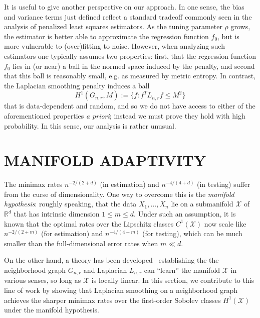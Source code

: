 \documentclass[twoside]{article}
\newcommand{\Reals}{\mathbb{R}}
\newcommand{\1}{\mathbf{1}}
\newcommand{\Rd}{\Reals^d}
\newcommand{\Lap}{L}
\newcommand{\Xset}{\mathcal{X}}
\theoremstyle{definition}
\theoremstyle{remark}
\begin{document}
It is useful to give another perspective on our approach. In one sense, the bias and variance terms just defined reflect a standard tradeoff commonly seen in the analysis of penalized least squares estimators. As the tuning parameter $\rho$ grows, the estimator is better able to approximate the regression function $f_0$, but is more vulnerable to (over)fitting to noise. However, when analyzing such estimators one typically assumes two properties: first, that the regression function $f_0$ lies in (or near) a ball in the normed space induced by the penalty, and second that this ball is reasonably small, e.g. as measured by metric entropy. In contrast, the Laplacian smoothing penalty induces a ball
\begin{equation*}
H^1(G_{n,r},M) := \{f: f^T \Lap_{n,r} f \leq M^2\}
\end{equation*}
that is data-dependent and random, and so we do not have access to either of the aforementioned properties \emph{a priori}; instead we must prove they hold with high probability. In this sense, our analysis is rather unusual.

\section{MANIFOLD ADAPTIVITY}
\label{sec:manifold_adaptivity}
The minimax rates $n^{-2/(2 + d)}$ (in estimation) and $n^{-4/(4 + d)}$ (in testing) suffer from the curse of dimensionality. One way to overcome this is the \emph{manifold hypothesis}: roughly speaking, that the data $X_1,\ldots,X_n$ lie on a submanifold $\Xset$ of $\Rd$ that has intrinsic dimension $1 \leq m \leq d$. Under such an assumption, it is known \citep{bickel2007, ariascastro2018} that the optimal rates over the Lipschitz classes $C^1(\Xset)$ now scale like $n^{-2/(2 + m)}$ (for estimation) and $n^{-4/(4 + m)}$ (for testing), which can be much smaller than the full-dimensional error rates when $m \ll d$. 

On the other hand, a theory has been developed~\citep{belkin03,belkin05,belkin2006,niyogi2013} establishing the the neighborhood graph $G_{n,r}$ and Laplacian $\Lap_{n,r}$ can ``learn'' the manifold $\Xset$ in various senses, so long as $\Xset$ is locally linear. In this section, we contribute to this line of work by showing that Laplacian smoothing on a neighborhood graph achieves the sharper minimax rates over the first-order Sobolev classes $H^1(\Xset)$ under the manifold hypothesis.
\end{document}
